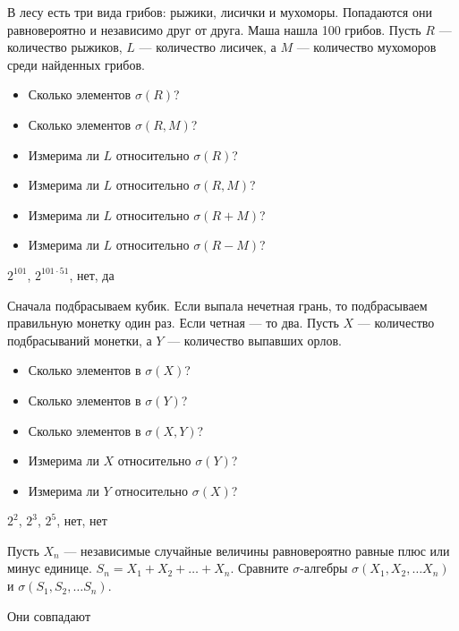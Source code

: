 \begin{problem}
В лесу есть три вида грибов: рыжики, лисички и мухоморы. Попадаются они равновероятно и независимо друг от друга. Маша нашла 100 грибов. Пусть $R$ — количество рыжиков, $L$ — количество лисичек, а $M$ — количество мухоморов среди найденных грибов.
\begin{itemize}
\item Сколько элементов $ \sigma(R)$?
\item Сколько элементов $ \sigma(R,M)$?
\item Измерима ли $L$ относительно $ \sigma(R)$?
\item Измерима ли $L$ относительно $ \sigma(R,M)$?
\item Измерима ли $L$ относительно $ \sigma(R+M)$?
\item Измерима ли $L$ относительно $ \sigma(R-M)$?
\end{itemize}

\begin{sol}
$ 2^{101} $, $2^{101\cdot 51}$, нет, да
\end{sol}
\end{problem}

\begin{problem}
Сначала подбрасываем кубик. Если выпала нечетная грань, то подбрасываем правильную монетку один раз. Если четная — то два. Пусть $X$ — количество подбрасываний монетки, а $Y$ — количество выпавших орлов.

\begin{itemize}

\item Сколько элементов в $ \sigma(X)$?
\item Сколько элементов в $ \sigma(Y)$?
\item Сколько элементов в $ \sigma(X,Y)$?
\item Измерима ли $ X $ относительно $ \sigma(Y)$?
\item Измерима ли $ Y $ относительно $ \sigma(X)$?

\end{itemize}

\begin{sol}
 $ 2^{2} $, $ 2^{3} $, $ 2^{5} $, нет, нет
\end{sol}
\end{problem}

\begin{problem}
Пусть $X_{n}$ — независимые случайные величины равновероятно равные плюс или минус единице. $S_{n}=X_{1}+X_{2}+\ldots+X_{n}$. Сравните $\sigma$-алгебры $ \sigma(X_{1},X_{2},\ldots X_{n}) $ и $ \sigma(S_{1},S_{2},\ldots S_{n}) $.

\begin{sol}
Они совпадают
\end{sol}
\end{problem}

